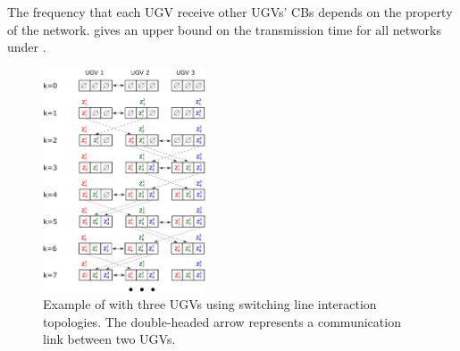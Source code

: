 	\begin{rem} 
		The frequency that each UGV receive other UGVs' CBs depends on the property of the network.
		 gives an upper bound on the transmission time for all {\fc} networks under {\proto}.
	\end{rem}
	
	
	
	\begin{figure}%
		\centering
		\includegraphics[width=0.43\textwidth]{figures/data_exchange_switch}
		\caption{Example of \proto with three UGVs using switching line interaction topologies. The double-headed arrow represents a communication link between two UGVs.}
		\label{fig:\proto}
	\end{figure}		
